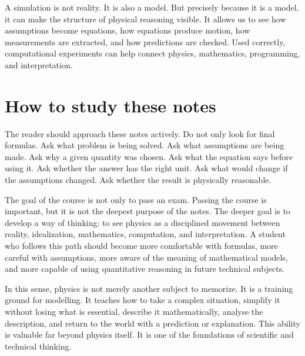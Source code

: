 A simulation is not reality. It is also a model. But precisely because it is a model, it can make the structure of physical reasoning visible. It allows us to see how assumptions become equations, how equations produce motion, how measurements are extracted, and how predictions are checked. Used correctly, computational experiments can help connect physics, mathematics, programming, and interpretation.

\section{How to study these notes}

The reader should approach these notes actively. Do not only look for final formulas. Ask what problem is being solved. Ask what assumptions are being made. Ask why a given quantity was chosen. Ask what the equation says before using it. Ask whether the answer has the right unit. Ask what would change if the assumptions changed. Ask whether the result is physically reasonable.

The goal of the course is not only to pass an exam. Passing the course is important, but it is not the deepest purpose of the notes. The deeper goal is to develop a way of thinking: to see physics as a disciplined movement between reality, idealization, mathematics, computation, and interpretation. A student who follows this path should become more comfortable with formulas, more careful with assumptions, more aware of the meaning of mathematical models, and more capable of using quantitative reasoning in future technical subjects.

In this sense, physics is not merely another subject to memorize. It is a training ground for modelling. It teaches how to take a complex situation, simplify it without losing what is essential, describe it mathematically, analyse the description, and return to the world with a prediction or explanation. This ability is valuable far beyond physics itself. It is one of the foundations of scientific and technical thinking.
